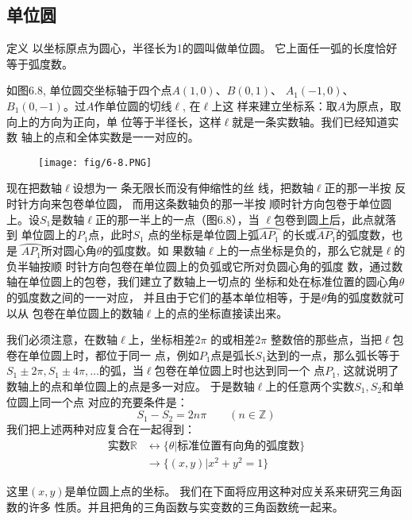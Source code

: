 \subsection{单位圆}
\begin{blk}{定义}
    以坐标原点为圆心，半径长为1的圆叫做单位圆。
它上面任一弧的长度恰好等于弧度数。
\end{blk}
 
如图6.8, 单位圆交坐标轴于四个点$A(1,0)$、$B(0,1)$、
$A_1(-1,0)$、$B_1(0,-1)$。过$A$作单位圆的切线$\ell$, 在$\ell$上这
样来建立坐标系：取$A$为原点，取向上的方向为正向，单
位等于半径长，这样$\ell$就是一条实数轴。我们已经知道实数
轴上的点和全体实数是一一对应的。

\begin{figure}[htp]
    \centering
\texttt{[image: fig/6-8.PNG]}
    \caption{}
\end{figure}



现在把数轴$\ell$设想为一
条无限长而没有伸缩性的丝
线，把数轴$\ell$正的那一半按
反时针方向来包卷单位圆，
而用这条数轴负的那一半按
顺时针方向包卷于单位圆上。设$S_1$是数轴$\ell$正的那一半上的一点（图6.8），当
$\ell$包卷到圆上后，此点就落到
单位圆上的$P_1$点，此时$S_1$
点的坐标是单位圆上弧$\wideparen{AP_1}$
的长或$\wideparen{AP_1}$的弧度数，也是
$\wideparen{AP_1}$所对圆心角$\theta$的弧度数。如
果数轴$\ell$上的一点坐标是负的，那么它就是$\ell$的负半轴按顺
时针方向包卷在单位圆上的负弧或它所对负圆心角的弧度
数，通过数轴在单位圆上的包卷，我们建立了数轴上一切点的
坐标和处在标准位置的圆心角$\theta$的弧度数之间的一一对应，
并且由于它们的基本单位相等，于是$\theta$角的弧度数就可以从
包卷在单位圆上的数轴$\ell$上的点的坐标直接读出来。

我们必须注意，在数轴$\ell$上，坐标相差$2\pi$ 的或相差$2\pi$ 
整数倍的那些点，当把$\ell$包卷在单位圆上时，都位于同一
点，例如$P_1$点是弧长$S_1$达到的一点，那么弧长等于$S_1\pm 2\pi,
S_1\pm 4\pi ,\ldots$的弧，当$\ell$包卷在单位圆上时也达到同一个
点$P_1$, 这就说明了数轴上的点和单位圆上的点是多一对应。
于是数轴$\ell$上的任意两个实数$S_1,S_2$和单位圆上同一个点
对应的充要条件是：
\[S_1-S_2=2n\pi \qquad  (n\in\mathbb{Z})\]
我们把上述两种对应复合在一起得到：
\begin{align*}
    \text{实数}\mathbb{R}& \longleftrightarrow  \{\theta|\text{标准位置有向角的弧度数}\}  \tag{一一对应}\\
& \longrightarrow \{(x,y)|x^2+y^2=1\} \tag{多一对应}
\end{align*}

这里$(x,y)$是单位圆上点的坐标。
我们在下面将应用这种对应关系来研究三角函数的许多
性质。并且把角的三角函数与实变数的三角函数统一起来。


